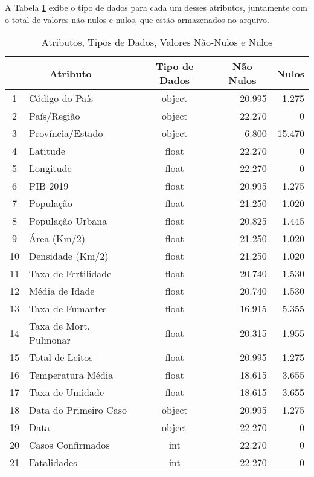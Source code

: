 \documentclass{ieeeaccess}
\begin{document}
A Tabela  \ref{tab2} exibe o tipo de dados para cada um desses atributos, juntamente com o total de valores não-nulos e nulos, que estão armazenados no arquivo. 

\begin{table}[t]
	\caption{Atributos, Tipos de Dados, Valores Não-Nulos e Nulos}
	\label{tab2}
	\setlength{\tabcolsep}{3pt}
	\setlength\extrarowheight{2.5pt}
	
	\centering
	\begin{tabular}{| c | l | c | r | r |}
		\hline
		\multicolumn{2}{|c|}{Atributo} & \multicolumn{1}{c|}{Tipo de Dados} & \multicolumn{1}{c|}{Não Nulos} & \multicolumn{1}{c|}{Nulos} \\ \hline
		
		1  & Código do País & object & 20.995 &  1.275 \\
		2 & País/Região & object & 22.270 & 0 \\
		3 & Província/Estado & object & 6.800 & 15.470  \\
		4 & Latitude & float & 22.270 &  0 \\
		5 & Longitude & float & 22.270 &  0 \\
		6 & PIB 2019 & float & 20.995 &  1.275 \\
		7 & População & float & 21.250 &  1.020 \\
		8 & População Urbana & float & 20.825 &  1.445 \\
		9 & Área (Km/2) & float & 21.250 & 1.020 \\
		10 & Densidade (Km/2) & float & 21.250 &  1.020 \\
		11 & Taxa de Fertilidade & float & 20.740 &  1.530 \\
		12 & Média de Idade & float & 20.740 &  1.530 \\
		13 & Taxa de Fumantes & float & 16.915 & 5.355 \\
		14 & Taxa de Mort. Pulmonar & float & 20.315 &  1.955 \\
		15 & Total de Leitos & float & 20.995 &  1.275 \\
		16 & Temperatura Média & float & 18.615 &  3.655\\
		17 & Taxa de Umidade & float & 18.615 & 3.655 \\
		18 & Data do Primeiro Caso & object & 20.995 &  1.275 \\
		19 & Data &  object & 22.270 & 0 \\
		20 & Casos Confirmados & int & 22.270 & 0 \\ 
		21 & Fatalidades & int & 22.270 &  0 \\ \hline
		
	\end{tabular}
\end{table}
\end{document}
